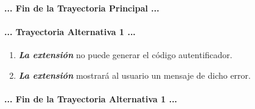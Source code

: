 \documentclass[12pt, a4paper, titlepage]{report}
\begin{document}
				\paragraph{... Fin de la Trayectoria Principal ...}
				
				\paragraph{... Trayectoria Alternativa 1 ...}
				\begin{enumerate}
				    \item \textbf{\textit{La extensión}} no puede generar el código autentificador.
					\item \textbf{\textit{La extensión}} mostrará al usuario un mensaje de dicho error.
				\end{enumerate}
				\paragraph{... Fin de la Trayectoria Alternativa 1 ...}
				
				\newpage

                
\end{document}
